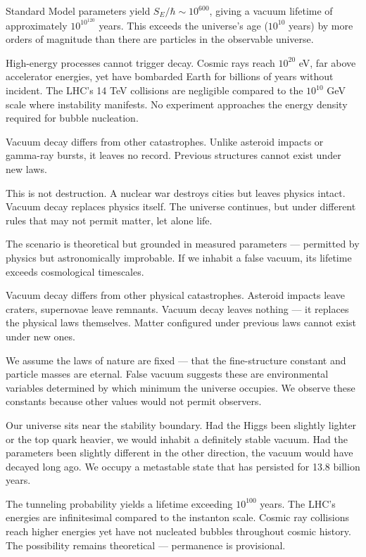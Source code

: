 Standard Model parameters yield $S_E/\hbar \sim 10^{600}$, giving a vacuum lifetime of approximately $10^{10^{120}}$ years. This exceeds the universe's age ($10^{10}$ years) by more orders of magnitude than there are particles in the observable universe.

High-energy processes cannot trigger decay. Cosmic rays reach $10^{20}$ eV, far above accelerator energies, yet have bombarded Earth for billions of years without incident. The LHC's 14 TeV collisions are negligible compared to the $10^{10}$ GeV scale where instability manifests. No experiment approaches the energy density required for bubble nucleation.

Vacuum decay differs from other catastrophes. Unlike asteroid impacts or gamma-ray bursts, it leaves no record. Previous structures cannot exist under new laws.

This is not destruction. A nuclear war destroys cities but leaves physics intact. Vacuum decay replaces physics itself. The universe continues, but under different rules that may not permit matter, let alone life.

The scenario is theoretical but grounded in measured parameters — permitted by physics but astronomically improbable. If we inhabit a false vacuum, its lifetime exceeds cosmological timescales.

    \begin{commentary}
    Vacuum decay differs from other physical catastrophes. Asteroid impacts leave craters, supernovae leave remnants. Vacuum decay leaves nothing — it replaces the physical laws themselves. Matter configured under previous laws cannot exist under new ones.
    
    We assume the laws of nature are fixed — that the fine-structure constant and particle masses are eternal. False vacuum suggests these are environmental variables determined by which minimum the universe occupies. We observe these constants because other values would not permit observers.
    
    Our universe sits near the stability boundary. Had the Higgs been slightly lighter or the top quark heavier, we would inhabit a definitely stable vacuum. Had the parameters been slightly different in the other direction, the vacuum would have decayed long ago. We occupy a metastable state that has persisted for 13.8 billion years.
    
    The tunneling probability yields a lifetime exceeding $10^{100}$ years. The LHC's energies are infinitesimal compared to the instanton scale. Cosmic ray collisions reach higher energies yet have not nucleated bubbles throughout cosmic history. The possibility remains theoretical — permanence is provisional.
    \end{commentary}
    